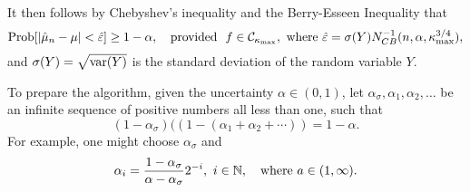 \documentclass{iitthesis}
\begin{document}
It then follows by Chebyshev's inequality and the Berry-Esseen Inequality  that 
\begin{equation*}
\operatorname{Prob}[\left \lvert \hat{\mu}_n -\mu \right \rvert<\hat{\varepsilon}] \geq 1-\alpha, \quad \text{provided } \ f \in \mathcal{C}_{\kappa_{\max}}, \text{ where }\hat{\varepsilon}=\sigma(Y) N_{CB}^{-1}(n,\alpha,\kappa_{\max}^{3/4}), 
\end{equation*} 
and $\sigma(Y)=\sqrt{\operatorname{var}(Y)}$ is the standard deviation of the random variable $Y$.  

To prepare the algorithm, given the uncertainty $\alpha \in (0,1)$, let $\alpha_{\sigma}, \alpha_1,  \alpha_2, \ldots$ be an infinite sequence of positive numbers all less than one, such that 
\begin{equation} \label{alphaseq}
(1-\alpha_{\sigma})((1-(\alpha_1+\alpha_2+\cdots)) = 1-\alpha.
\end{equation}
For example, one might choose $\alpha_{\sigma}$ and 
\begin{equation} \label{alphaseqex}
\alpha_{i} = \frac{1-\alpha_\sigma}{\alpha-\alpha_\sigma} 2^{-i}, \ i\in \mathbb{N}, \quad \text{where} \  a \in (1,\infty).
\end{equation}
\end{document}
